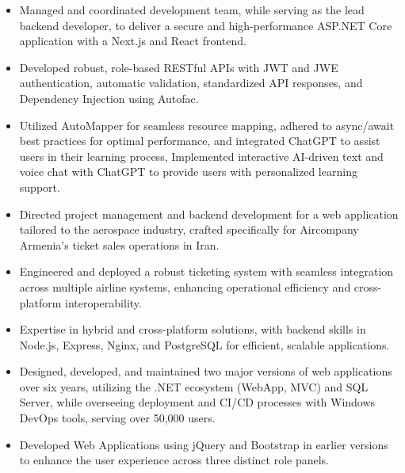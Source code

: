 \documentclass[10pt,a4paper]{altacv}
\begin{document}
\begin{itemize}
\item Managed and coordinated development team, while serving as the lead backend developer, to deliver a secure and high-performance ASP.NET Core application with a Next.js and React frontend.
\item Developed robust, role-based RESTful APIs with JWT and JWE authentication, automatic validation, standardized API responses, and Dependency Injection using Autofac.
\item Utilized AutoMapper for seamless resource mapping, adhered to async/await best practices for optimal performance, and integrated ChatGPT to assist users in their learning process, Implemented interactive AI-driven text and voice chat with ChatGPT to provide users with personalized learning support.
\end{itemize}
{}
\begin{itemize}
\item Directed project management and backend development for a web application tailored to the aerospace industry, crafted specifically for Aircompany Armenia’s ticket sales operations in Iran.
\item Engineered and deployed a robust ticketing system with seamless integration across multiple airline systems, enhancing operational efficiency and cross-platform interoperability.
\item Expertise in hybrid and cross-platform solutions, with backend skills in Node.js, Express, Nginx, and PostgreSQL for efficient, scalable applications.
\end{itemize}
{}
\begin{itemize}
\item Designed, developed, and maintained two major versions of web applications over six years, utilizing the .NET ecosystem (WebApp, MVC) and SQL Server, while overseeing deployment and CI/CD processes with Windows DevOps tools, serving over 50,000 users.
\item Developed Web Applications using jQuery and Bootstrap in earlier versions to enhance the user experience across three distinct role panels.
\end{itemize}
\end{document}
